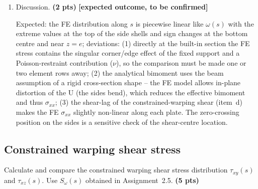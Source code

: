 \begin{enumerate}[label=\roman*.]
  \item Discussion. \textbf{(2 pts)} \textbf{[expected outcome, to be confirmed]}

  Expected: the FE distribution along $s$ is piecewise linear like $\omega(s)$ with the extreme values at the top of the side shells and sign changes at the bottom centre and near $z=e$; deviations: (1) directly at the built-in section the FE stress contains the singular corner/edge effect of the fixed support and a Poisson-restraint contribution ($\nu$), so the comparison must be made one or two element rows away; (2) the analytical bimoment uses the beam assumption of a rigid cross-section shape -- the FE model allows in-plane distortion of the U (the sides bend), which reduces the effective bimoment and thus $\sigma_{xx}$; (3) the shear-lag of the constrained-warping shear (item~d) makes the FE $\sigma_{xx}$ slightly non-linear along each plate. The zero-crossing position on the sides is a sensitive check of the shear-centre location.
\end{enumerate}

\subsection{Constrained warping shear stress}

Calculate and compare the constrained warping shear stress distribution $\tau_{xy}(s)$ and $\tau_{xz}(s)$. Use $S_\omega(s)$ obtained in Assignment~2.5. \textbf{(5 pts)}

